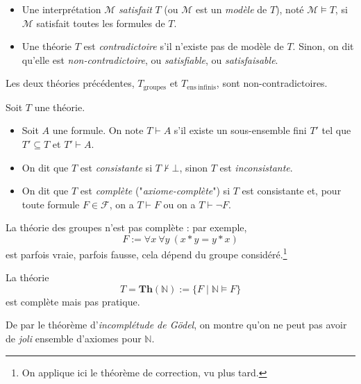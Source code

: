 \documentclass[./main]{subfiles}
\begin{document}
  \begin{defn}[Sémantique]
    \begin{itemize}
      \item Une interprétation $\mathcal{M}$ \textit{satisfait} $T$ (ou $\mathcal{M}$ est un \textit{modèle} de $T$), noté $\mathcal{M} \models T$, si $\mathcal{M}$ satisfait toutes les formules de $T$.
      \item Une théorie $T$ est \textit{contradictoire} s'il n'existe pas de modèle de $T$. Sinon, on dit qu'elle est \textit{non-contradictoire}, ou \textit{satisfiable}, ou \textit{satisfaisable}.
    \end{itemize}
  \end{defn}

  \begin{exm}
    Les deux théories précédentes, $T_\mathrm{groupes}$ et $T_\mathrm{ens\ infinis}$, sont non-contradictoires.
  \end{exm}

  \begin{defn}[Syntaxique]
    Soit $T$ une théorie.
    \begin{itemize}
      \item Soit $A$ une formule. On note $T \vdash A$ s'il existe un sous-ensemble fini $T'$ tel que $T' \subseteq T$ et $T' \vdash A$.
      \item On dit que $T$ est \textit{consistante} si $T \nvdash \bot$, sinon $T$ est \textit{inconsistante}.
      \item On dit que $T$ est \textit{complète} ("\textit{axiome-complète}") si $T$ est consistante et, pour toute formule $F \in \mathcal{F}$, on a $T \vdash F$ ou on a $T \vdash \lnot F$.
    \end{itemize}
  \end{defn}

  \begin{exm}
    La théorie des groupes n'est pas complète : par exemple, \[
    F := \forall x \: \forall y \: (x * y = y * x)
    \] est parfois vraie, parfois fausse, cela dépend du groupe considéré.\footnote{On applique ici le théorème de correction, vu plus tard.}
  \end{exm}

  \begin{exm}
    La théorie \[
      T = \mathbf{Th}(\mathds{N}) := \{F  \mid \mathds{N} \models F\}
    \] est complète mais pas pratique.

    De par le théorème d'\textit{incomplétude de Gödel}, on montre qu'on ne peut pas avoir de \textit{joli} ensemble d'axiomes pour $\mathds{N}$.
  \end{exm}
\end{document}
